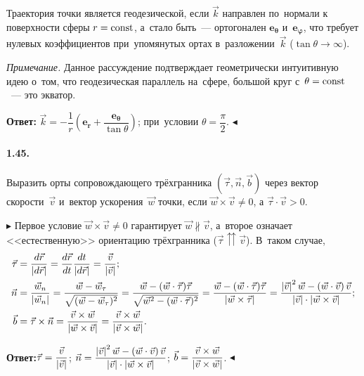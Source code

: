 \documentclass{weekly}
\begin{document}
Траектория точки является геодезической, если $\vec k$
направлен по~нормали к поверхности сферы $r = \mathrm{const}$,
а~стало быть~--- ортогонален $\mathbf{e_\theta}$
и~$\mathbf{e_\varphi}$, что требует нулевых коэффициентов
при~упомянутых ортах в~разложении~$\vec k$
($\tan\theta \to \infty$).

\textsl{Примечание.} Данное рассуждение подтверждает
геометрически интуитивную идею о~том, что геодезическая параллель
на~сфере, большой круг с~$\theta = \mathrm{const}$~--- это экватор.

\textbf{Ответ:}\quad
$\vec k = -\dfrac{1}{r} \left( \mathbf{e_r} +
    \dfrac{\mathbf{e_\theta}}{\tan\theta} \right)$;\qquad
при~условии $\theta = \dfrac{\pi}{2}$.
\hfill $\blacktriangleleft$


\paragraph{1.45.} Выразить орты сопровождающего трёхгранника
$(\vec\tau, \vec n, \vec b)$ через вектор скорости~$\vec v$ и~вектор
ускорения~$\vec w$ точки, если $\vec w \times \vec v \neq 0$,
а $\vec\tau \cdot \vec v > 0$.

$\blacktriangleright$ Первое условие $\vec w \times \vec v \neq 0$
гарантирует $\vec w \nparallel \vec v$, а~второе означает
<<естественную>> ориентацию трёхгранника ($\vec \tau \upuparrows
\vec v$). В~таком случае,
\begin{align}
    \vec\tau &= \frac{d\vec r}{\left| d\vec r \right|}
        = \frac{d\vec r}{dt} \frac{dt}{\left| d\vec r \right|}
        = \frac{\vec v}{\left| \vec v \right|}; \\
    \vec n &= \frac{\vec w_n}{\left| \vec w_n \right|}
        = \frac{\vec w - \vec w_\tau}{\sqrt{(\vec w - \vec w_\tau)^2}}
        = \frac{\vec w - (\vec w \cdot \vec\tau) \vec\tau}
            {\sqrt{\vec w^2 - (\vec w \cdot \vec\tau)^2}}
        = \frac{\vec w - (\vec w \cdot \vec\tau) \vec\tau}
            {\left| \vec w \times \vec\tau \right|}
        = \frac{\left| \vec v \right|^2 \vec w - (\vec w \cdot \vec v)\,\vec v}
            {\left| \vec v \right| \cdot \left| \vec w \times \vec v \right|}; \\
    \vec b &= \vec\tau \times \vec n
        = \frac{\vec v \times \vec w}{\left| \vec w \times \vec v \right|}
        = \frac{\vec v \times \vec w}{\left| \vec v \times \vec w \right|}.
\end{align}

\textbf{Ответ:}\quad $\vec\tau = \dfrac{\vec v}{\left| \vec v \right|}$;\qquad
$\vec n = \dfrac{\left| \vec v \right|^2 \vec w -
    (\vec w \cdot \vec v)\,\vec v}
    {\left| \vec v \right| \cdot \left| \vec w \times \vec v \right|}$;\qquad
$\vec b = \dfrac{\vec v \times \vec w}{\left| \vec v \times \vec w \right|}$.
\hfill $\blacktriangleleft$
\end{document}

